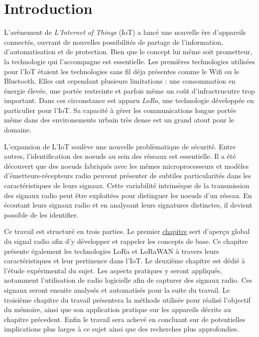 

\chapter*{Introduction}

\renewcommand{\leftmark}{INTRODUCTION}

L'avènement de \textit{L'Internet of Things} (IoT) a lancé une nouvelle ère d'appareils connectés, ouvrant de nouvelles possibilités de partage de l'information, d'automatisation et de protection. Bien que le concept lui même soit prometteur, la technologie qui l'accompagne est essentielle.
Les premières technologies utilisées pour l'IoT étaient les technologies sans fil déja présentes comme le Wifi ou le Bluetooth. Elles ont cependant plusieurs limitations : une consommation en énergie élevée, une portée restreinte et parfois même un coût d'infractrucutre trop important.
Dans ces circonstance est apparu \textit{LoRa}, une technologie développée en particulier pour l'IoT. Sa capacité à gérer les communications longue portée même dans des environements urbain très dense est un grand atout pour le domaine.

\vspace{0.1cm}

L'expansion de L'IoT soulève une nouvelle problèmatique de sécurité. Entre autres, l'identification des noeuds au sein des réseaux est essentielle. Il a été découvert que des noeuds fabriqués avec les mêmes microprocesseurs et modèles d'émetteurs-récepteurs radio peuvent présenter de subtiles particularités dans les caractéristiques de leurs signaux. Cette variabilité intrinsèque de la transmission des signaux radio peut être exploitées pour distinguer les noeuds d’un réseau. En écoutant leurs signaux radio et en analysant leurs signatures distinctes, il devient possible de les identifier.

\vspace{0.1cm}

Ce travail est structuré en trois parties. Le premier          \hyperref[chap1]{chapitre} sert d'aperçu global du signal radio afin d'y développer et rappeler les concepts de base. Ce chapitre présente également les technologies LoRa et LoRaWAN à travers leurs caractéristiques et leur pertinence dans l'IoT.
Le deuxième chapitre est dédié à l'étude expérimental du sujet. Les aspects pratiques y seront appliqués, notamment l'utilisation de radio logicielle afin de capturer des signaux radio. Ces signaux seront ensuite analysés et automatisés pour la suite du travail.
Le troisième chapitre du travail présentera la méthode utilisée pour réalisé l'objectif du mémoire, ainsi que son application pratique sur les appareils décrits au chapitre précedent. Enfin le travail sera achevé en concluant sur de potentielles implications plus larges à ce sujet ainsi que des recherches plus approfondies.

